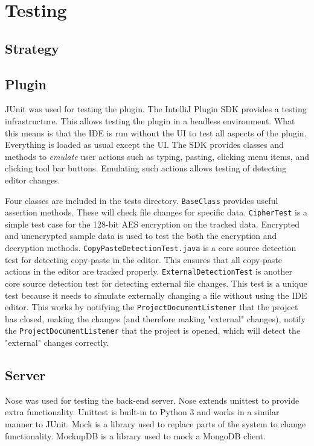 \chapter{Testing}
\label{chp:testing}
\section{Strategy}

\section{Plugin}
JUnit was used for testing the plugin. The IntelliJ Plugin SDK provides a testing infrastructure. This allows testing the plugin in a headless environment. What this means is that the IDE is run without the UI to test all aspects of the plugin. Everything is loaded as usual except the UI. The SDK provides classes and methods to \textit{emulate} user actions such as typing, pasting, clicking menu items, and clicking tool bar buttons. Emulating such actions allows testing of detecting editor changes.

Four classes are included in the tests directory. \texttt{BaseClass} provides useful assertion methods. These will check file changes for specific data. \texttt{CipherTest} is a simple test case for the 128-bit AES encryption on the tracked data. Encrypted and unencrypted sample data is used to test the both the encryption and decryption methods. \texttt{CopyPasteDetectionTest.java} is a core source detection test for detecting copy-paste in the editor. This ensures that all copy-paste actions in the editor are tracked properly. \texttt{ExternalDetectionTest} is another core source detection test for detecting external file changes. This test is a unique test because it needs to simulate externally changing a file without using the IDE editor. This works by notifying the \texttt{ProjectDocumentListener} that the project has closed, making the changes (and therefore making "external" changes), notify the \texttt{ProjectDocumentListener} that the project is opened, which will detect the "external" changes correctly.

\section{Server}
Nose was used for testing the back-end server. Nose extends unittest to provide extra functionality. Unittest is built-in to Python 3 and works in a similar manner to JUnit. Mock is a library used to replace parts of the system to change functionality. MockupDB is a library used to mock a MongoDB client.

